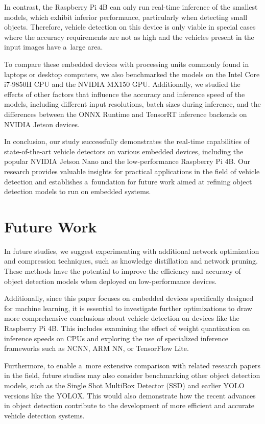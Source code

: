 In contrast, the Raspberry Pi 4B can only run real-time inference of the
smallest models, which exhibit inferior performance, particularly when detecting
small objects. Therefore, vehicle detection on this device is only viable in
special cases where the accuracy requirements are not as high and the vehicles
present in the input images have a~large area.

To compare these embedded devices with processing units commonly found in
laptops or desktop computers, we also benchmarked the models on the Intel Core
i7-9850H CPU and the NVIDIA MX150 GPU. Additionally, we studied the effects of
other factors that influence the accuracy and inference speed of the models,
including different input resolutions, batch sizes during inference, and the
differences between the ONNX Runtime and TensorRT inference backends on NVIDIA
Jetson devices.

In conclusion, our study successfully demonstrates the real-time capabilities of
state-of-the-art vehicle detectors on various embedded devices, including the
popular NVIDIA Jetson Nano and the low-performance Raspberry Pi 4B. Our research
provides valuable insights for practical applications in the field of vehicle
detection and establishes a~foundation for future work aimed at refining object
detection models to run on embedded systems.




\chapter{Future Work}
\label{FutureWork}

In future studies, we suggest experimenting with additional network optimization
and compression techniques, such as knowledge distillation and network pruning.
These methods have the potential to improve the efficiency and accuracy of
object detection models when deployed on low-performance devices.

Additionally, since this paper focuses on embedded devices specifically designed
for machine learning, it is essential to investigate further optimizations to
draw more comprehensive conclusions about vehicle detection on devices like the
Raspberry Pi 4B. This includes examining the effect of weight quantization on
inference speeds on CPUs and exploring the use of specialized inference frameworks
such as NCNN, ARM NN, or TensorFlow Lite.

Furthermore, to enable a~more extensive comparison with related research papers
in the field, future studies may also consider benchmarking other object
detection models, such as the Single Shot MultiBox Detector (SSD) and earlier
YOLO versions like the YOLOX. This would also demonstrate how the recent
advances in object detection contribute to the development of more efficient and
accurate vehicle detection systems.




